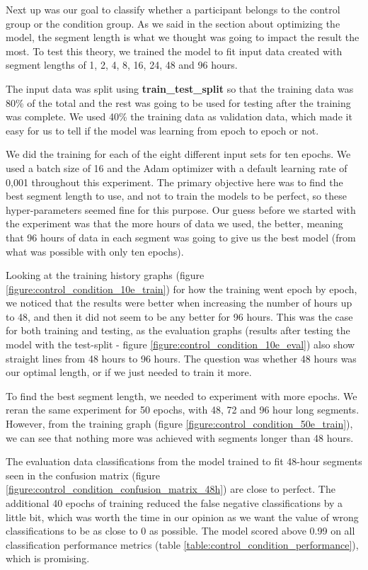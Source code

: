 Next up was our goal to classify whether a participant belongs to the control group or the condition group. As we said in the section about optimizing the model, the segment length is what we thought was going to impact the result the most. To test this theory, we trained the model to fit input data created with segment lengths of 1, 2, 4, 8, 16, 24, 48 and 96 hours. 

The input data was split using \textbf{train\_test\_split} so that the training data was 80\% of the total and the rest was going to be used for testing after the training was complete. We used 40\% the training data as validation data, which made it easy for us to tell if the model was learning from epoch to epoch or not. 

We did the training for each of the eight different input sets for ten epochs. We used a batch size of 16 and the Adam optimizer with a default learning rate of 0,001 throughout this experiment. The primary objective here was to find the best segment length to use, and not to train the models to be perfect, so these hyper-parameters seemed fine for this purpose. Our guess before we started with the experiment was that the more hours of data we used, the better, meaning that 96 hours of data in each segment was going to give us the best model (from what was possible with only ten epochs).

Looking at the training history graphs (figure \ref{figure:control_condition_10e_train}) for how the training went epoch by epoch, we noticed that the results were better when increasing the number of hours up to 48, and then it did not seem to be any better for 96 hours. This was the case for both training and testing, as the evaluation graphs (results after testing the model with the test-split - figure \ref{figure:control_condition_10e_eval}) also show straight lines from 48 hours to 96 hours. The question was whether 48 hours was our optimal length, or if we just needed to train it more.

To find the best segment length, we needed to experiment with more epochs. We reran the same experiment for 50 epochs, with 48, 72 and 96 hour long segments. However, from the training graph (figure \ref{figure:control_condition_50e_train}), we can see that nothing more was achieved with segments longer than 48 hours. 

The evaluation data classifications from the model trained to fit 48-hour segments seen in the confusion matrix (figure \ref{figure:control_condition_confusion_matrix_48h}) are close to perfect. The additional 40 epochs of training reduced the false negative classifications by a little bit, which was worth the time in our opinion as we want the value of wrong classifications to be as close to 0 as possible. The model scored above 0.99 on all classification performance metrics (table \ref{table:control_condition_performance}), which is promising.

